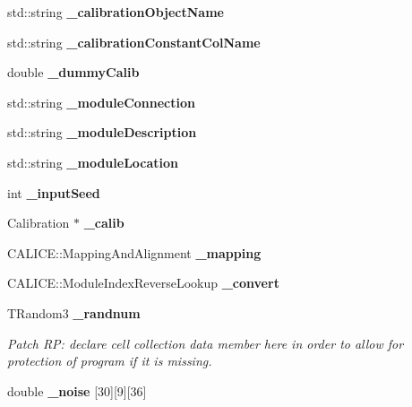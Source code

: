 \begin{DoxyCompactItemize}
\item 
std\-::string {\bfseries \-\_\-calibration\-Object\-Name}\label{classCALICE_1_1TBEcalDigitisation_af099ceeb1cec40bde0155326b0dceb26}

\item 
std\-::string {\bfseries \-\_\-calibration\-Constant\-Col\-Name}\label{classCALICE_1_1TBEcalDigitisation_a57ac73dc90456022a4bb5571a10af6bf}

\item 
double {\bfseries \-\_\-dummy\-Calib}\label{classCALICE_1_1TBEcalDigitisation_a24178b15603a94e9e5d28bbfe14ed64e}

\item 
std\-::string {\bfseries \-\_\-module\-Connection}\label{classCALICE_1_1TBEcalDigitisation_a63200bcd1fda80a6243bacd7cd534485}

\item 
std\-::string {\bfseries \-\_\-module\-Description}\label{classCALICE_1_1TBEcalDigitisation_acabe9d519c96bba0eb623c9757b3f75e}

\item 
std\-::string {\bfseries \-\_\-module\-Location}\label{classCALICE_1_1TBEcalDigitisation_af9f67abc019e0d7cec95ac03fc6b6396}

\item 
int {\bfseries \-\_\-input\-Seed}\label{classCALICE_1_1TBEcalDigitisation_a4daab5c5295efaede5a0e5656396ccc2}

\item 
Calibration $\ast$ {\bfseries \-\_\-calib}\label{classCALICE_1_1TBEcalDigitisation_a6fd75835047c58831f134f6396015817}

\item 
C\-A\-L\-I\-C\-E\-::\-Mapping\-And\-Alignment {\bfseries \-\_\-mapping}\label{classCALICE_1_1TBEcalDigitisation_a1208e39d52a7cc7547c81eac160e6829}

\item 
C\-A\-L\-I\-C\-E\-::\-Module\-Index\-Reverse\-Lookup {\bfseries \-\_\-convert}\label{classCALICE_1_1TBEcalDigitisation_a4a1dd197c0a75c2637ff0cfe649c44f4}

\item 
T\-Random3 {\bf \-\_\-randnum}\label{classCALICE_1_1TBEcalDigitisation_a1ac4e0e9dd9ff398f129b95d112fd6d9}

\begin{DoxyCompactList}\small\item\em Patch R\-P\-: declare cell collection data member here in order to allow for protection of program if it is missing. \end{DoxyCompactList}\item 
double {\bfseries \-\_\-noise} [30][9][36]\label{classCALICE_1_1TBEcalDigitisation_ad5685dc5810278e5e1227cb6070b490e}


\end{DoxyCompactItemize}
